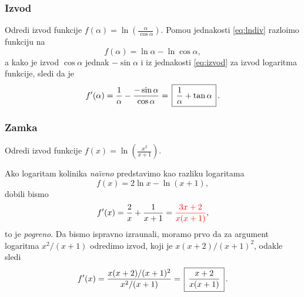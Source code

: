 \subsubsection{Izvod}

\zadatak Odredi izvod funkcije $\displaystyle{f(\alpha)=\ln\left(\frac\alpha{\cos\alpha}\right)}$.
\resenje Pomo{\cc}u jednakosti \eqref{eq:lndiv} razlo{\zv}imo funkciju na 
$$f(\alpha)=\ln\alpha-\ln\cos\alpha,$$ 
a kako je izvod $\cos\alpha$ jednak $-\sin\alpha$ i iz jednakosti 
\eqref{eq:izvod} za izvod logaritma funkcije, sledi da je
$$
f'(\alpha)
=\frac1\alpha-\frac{-\sin\alpha}{\cos\alpha}
=\ram{\frac1\alpha+\tan\alpha}.
$$


\subsubsection{Zamka}

\zadatak Odredi izvod funkcije $\displaystyle {f(x)=\ln\left(\frac{x^2}{x+1}\right)}$.

\resenje Ako logaritam koli{\cv}nika {\sl na\"\i vno\/} predstavimo kao razliku logaritama
$$
f(x) = 2\ln x - \ln (x+1),
$$
dobili bismo 
$$
f'(x) = \frac2x + \frac1{x+1} = {\color{red}\frac{3x+2}{x(x+1)}},
$$
{\sv}to je {\sl pogre{\sv}no}. Da bismo ispravno izra{\cv}unali, moramo prvo da za argument
logaritma $x^2/(x+1)$ odredimo izvod, koji je $x(x+2)/(x+1)^2$, odakle sledi
$$
f'(x)=\frac{x(x+2)/(x+1)^2}{x^2/(x+1)}=\ram{\frac{x+2}{x(x+1)}}.
$$
